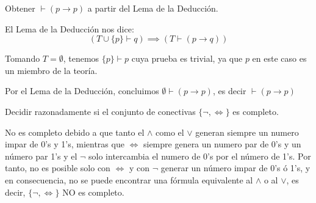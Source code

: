 \begin{problem}[9]
Obtener $\vdash (p\to p)$ a partir del Lema de la Deducci\'on.
\solution


El Lema de la Deducción nos dice: \[(T \cup \{p\} \vdash q) \implies (T\vdash (p\to q))\]

Tomando $T=\emptyset$, tenemos $\{p\} \vdash p$ cuya prueba es trivial, ya que $p$ en este caso es un miembro de la teoría.

Por el Lema de la Deducción, concluimos $\emptyset \vdash (p\to p)$, es decir $\vdash (p\to p)$


\end{problem}

\begin{problem}[10]
Decidir razonadamente si el conjunto de conectivas $\{¬,\iff\}$ es completo.
\label{ejer::H3P10}
\solution

No es completo debido a que tanto el $\land$ como el $\lor$ generan siempre un numero impar de 0's y 1's, mientras que $\iff$ siempre genera un numero par de 0's y un número par 1's y el $\neg$ solo intercambia el numero de 0's por el número de 1's. Por tanto, no es posible solo con $\iff$ y con $\neg$ generar un número impar de 0's ó 1's, y en consecuencia, no se puede encontrar una fórmula equivalente al $\land$ o al $\lor$, es decir, $\{\neg,\iff\}$ NO es completo.

\end{problem}

